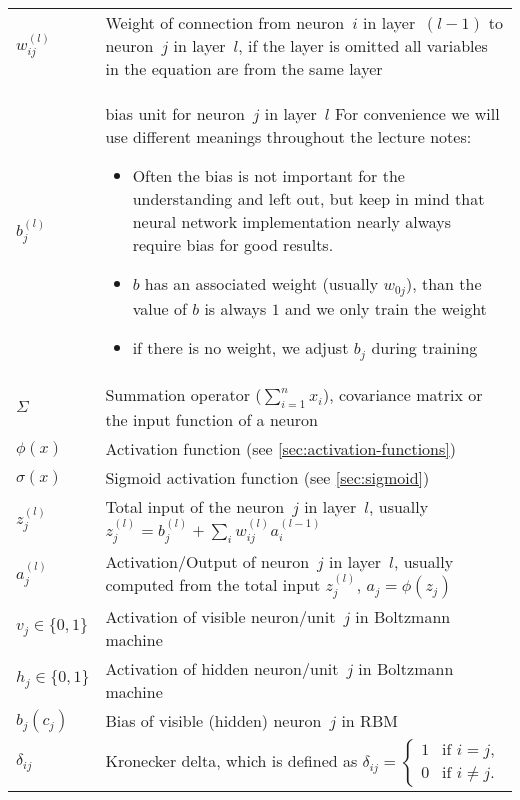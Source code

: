 \begin{tabularx}{\textwidth}{ l X }
\midrule %
$w_{ij}^{(l)}$	& Weight of connection from neuron~$i$ in layer~$(l-1)$ to neuron~$j$ in layer~$l$, if the layer is omitted all variables in the equation are from the same layer \\
$b_j^{(l)}$	& bias unit for neuron~$j$ in layer~$l$ \newline For convenience we will use different meanings throughout the lecture notes:
				\begin{itemize}
				\item Often the bias is not important for the understanding and left out, but keep in mind that neural network implementation nearly always require bias for good results.
				\item $b$ has an associated weight (usually $w_{0j}$), than the value of $b$ is always $1$ and we only train the weight
				\item if there is no weight, we adjust $b_j$ during training
				\end{itemize} \\
$\Sigma$		& Summation operator (\eg $\sum_{i=1}^n x_i$), covariance matrix or the input function of a neuron \\
$\phi(x)$		& Activation function (see \ref{sec:activation-functions}) \\
$\sigma(x)$		& Sigmoid activation function (see \ref{sec:sigmoid}) \\
$z_j^{(l)}$		& Total input of the neuron~$j$ in layer~$l$, usually $z_j^{(l)} = b_j^{(l)} + \sum_i w_{ij}^{(l)} a_i^{(l-1)}$ \\
$a_j^{(l)}$		& Activation/Output of neuron~$j$ in layer~$l$, usually computed from the total input $z_j^{(l)}$, $a_j=\phi(z_j)$ \\

\midrule %
$v_j \in \{0,1\}$ & Activation of visible neuron/unit~$j$ in Boltzmann machine \\
$h_j \in \{0,1\}$ & Activation of hidden neuron/unit~$j$ in Boltzmann machine \\
$b_j (c_j)$		& Bias of visible (hidden) neuron~$j$ in \gls{RBM} \\

\midrule %
$\delta_{ij}$	&  Kronecker delta, which is defined as $\delta_{ij}=\begin{cases}1 &\text{if } i = j,\\0 &\text{if } i \neq j.\end{cases}$
\end{tabularx}